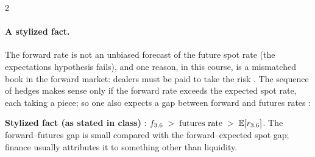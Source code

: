 \begin{paracol}{2}
\begin{nfigure}
\caption{A sequence of hedging transactions .}\label{fig:ff-chain}
\end{nfigure}

\paragraph{A stylized fact.} The forward rate is not an unbiased forecast of the future spot rate (the expectations hypothesis fails), and one reason, in this
course, is a mismatched book in the forward market: dealers must be paid to take the risk . The sequence of hedges
makes sense only if the forward rate exceeds the expected spot rate, each taking a piece; so one also expects a gap between forward and futures rates
:
\begin{keyformulas}
\textbf{Stylized fact (as stated in class)} : \quad $f_{3,6} \;>\; \text{futures rate} \;>\; \mathbb{E}[r_{3,6}]$. The forward--futures gap
is small compared with the forward--expected spot gap; finance usually attributes it to something other than liquidity.
\end{keyformulas}


\end{paracol}
